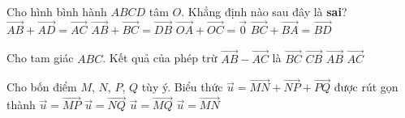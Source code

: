 \begin{ex}%
	Cho hình bình hành $ABCD$ tâm $O$. Khẳng định nào sau đây là \textbf{sai}?
	\choice
	{$\overrightarrow{AB} + \overrightarrow{AD} = \overrightarrow{AC}$}
	{\True $\overrightarrow{AB} + \overrightarrow{BC} = \overrightarrow{DB}$}
	{$\overrightarrow{OA} + \overrightarrow{OC} = \overrightarrow{0}$}
	{$\overrightarrow{BC} + \overrightarrow{BA} = \overrightarrow{BD}$}
\end{ex}
\begin{ex}%
	Cho tam giác $ABC$. Kết quả của phép trừ $\overrightarrow{AB} - \overrightarrow{AC}$ là
	\choice
	{$\overrightarrow{BC}$}
	{\True $\overrightarrow{CB}$}
	{$\overrightarrow{AB}$}
	{$\overrightarrow{AC}$}
\end{ex}
\begin{ex}%
	Cho bốn điểm $M$, $N$, $P$, $Q$ tùy ý. Biểu thức $\overrightarrow{u} = \overrightarrow{MN} + \overrightarrow{NP} + \overrightarrow{PQ}$ được rút gọn thành
	\choice
	{$\overrightarrow{u} = \overrightarrow{MP}$}
	{$\overrightarrow{u} = \overrightarrow{NQ}$}
	{\True $\overrightarrow{u} = \overrightarrow{MQ}$}
	{$\overrightarrow{u} = \overrightarrow{MN}$}
\end{ex}
